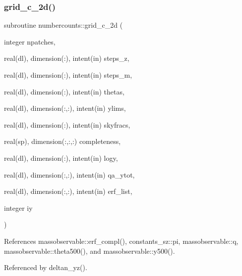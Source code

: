 \subsubsection{\texorpdfstring{grid\+\_\+c\+\_\+2d()}{grid\_c\_2d()}}
{\footnotesize\ttfamily subroutine numbercounts\+::grid\+\_\+c\+\_\+2d (\begin{DoxyParamCaption}\item[{integer}]{npatches,  }\item[{real(dl), dimension(\+:), intent(in)}]{steps\+\_\+z,  }\item[{real(dl), dimension(\+:), intent(in)}]{steps\+\_\+m,  }\item[{real(dl), dimension(\+:), intent(in)}]{thetas,  }\item[{real(dl), dimension(\+:,\+:), intent(in)}]{ylims,  }\item[{real(dl), dimension(\+:), intent(in)}]{skyfracs,  }\item[{real(sp), dimension(\+:,\+:,\+:)}]{completeness,  }\item[{real(dl), dimension(\+:), intent(in)}]{logy,  }\item[{real(dl), dimension(\+:,\+:), intent(in)}]{qa\+\_\+ytot,  }\item[{real(dl), dimension(\+:,\+:), intent(in)}]{erf\+\_\+list,  }\item[{integer}]{iy }\end{DoxyParamCaption})}



References massobservable\+::erf\+\_\+compl(), constants\+\_\+sz\+::pi, massobservable\+::q, massobservable\+::theta500(), and massobservable\+::y500().



Referenced by deltan\+\_\+yz().

